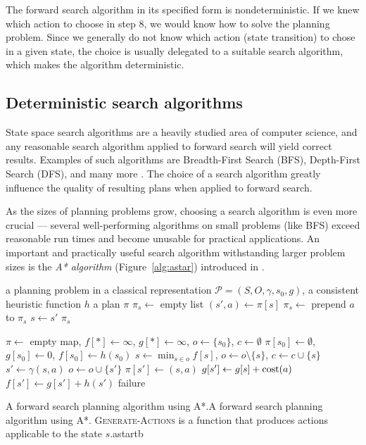 The forward search algorithm in its specified form is nondeterministic.
If we knew which action to choose in step 8,
we would know how to solve the planning problem.
Since we generally do not know which action (state transition) to chose in a given state, the choice is usually delegated to a suitable
search algorithm, which makes the algorithm deterministic.


\subsection{Deterministic search algorithms}

State space search algorithms are a heavily studied area
of computer science, and any reasonable search algorithm applied
to forward search will yield correct results.
Examples of such algorithms are Breadth-First Search (BFS), 
Depth-First Search (DFS), and many more \citep[Section~3.5]{Russell1995}.
The choice of a search algorithm greatly influence
the quality of resulting plans when applied to forward search.

As the sizes of planning problems grow,
choosing a search algorithm is even more crucial ---
several well-performing algorithms on small problems (like BFS)
exceed reasonable run times and become unusable for practical applications.
An important and practically useful search algorithm
withstanding larger problem sizes is the \textit{A* algorithm} (Figure~\ref{alg:astar})
introduced in \citet{Hart1968}.

%
{%
\Input a planning problem in a classical representation $\mathcal{P} = (S, O, \gamma, s_0, g)$,
a consistent heuristic function $h$
\Output a plan $\pi$
\State $\pi_s \gets $ empty list
	\State $(s', a) \gets \pi[s]$
	\State $\pi_s \gets$ prepend $a$ to $\pi_s$
	\State $s \gets s'$
\EndWhile
\State \Return $\pi_s$
\EndFunction

\State $\pi \gets $ empty map, $f[*] \gets \infty$, $g[*] \gets \infty$, $o \gets \{s_0\}$, $c \gets \emptyset$
\State $\pi[s_0] \gets \emptyset$, 
$g[s_0] \gets 0$, $f[s_0] \gets h(s_0)$
\State $s \gets \min_{s \in o} f[s]$, $o \gets o \setminus \{s\}$, $c \gets c \cup \{s\}$
 \Return {} \EndIf
{}
	\State $s' \gets \gamma(s, a)$
	 
		 $o \gets o \cup \{s'\}$  \EndIf 
		 
			\State $\pi[s'] \gets (s, a)$
			\State $g[s'] \gets g[s] + \textrm{cost}(a)$
			\State $f[s'] \gets g[s'] + h(s')$
		\EndIf
	\EndIf
\EndFor
\EndWhile
\Return failure
\EndFunction
}%
{A forward search planning algorithm using A*.}{A forward search planning algorithm using A*.
\textsc{Generate-Actions} is a function that produces actions applicable to the state $s$.}{astar}{tb}

